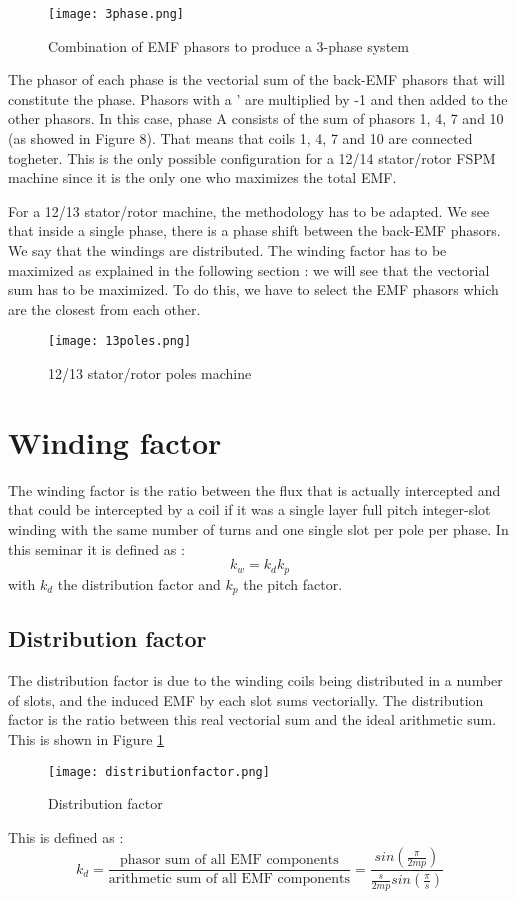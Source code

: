 \begin{figure}
    \centering
    \texttt{[image: 3phase.png]}
    \caption{Combination of EMF phasors to produce a 3-phase system}
\end{figure}

The phasor of each phase is the vectorial sum of the back-EMF phasors that will constitute the phase. Phasors with a ' are multiplied by -1 and then added to the other phasors. In this case, phase A consists of the sum of phasors 1, 4, 7 and 10 (as showed in Figure 8). That means that coils 1, 4, 7 and 10 are connected togheter. This is the only possible configuration for a 12/14 stator/rotor FSPM machine since it is the only one who maximizes the total EMF.

For a 12/13 stator/rotor machine, the methodology has to be adapted. We see that inside a single phase, there is a phase shift between the back-EMF phasors. We say that the windings are distributed. The winding factor has to be maximized as explained in the following section : we will see that the vectorial sum has to be maximized. To do this, we have to select the EMF phasors which are the closest from each other.

\begin{figure}
    \centering
    \texttt{[image: 13poles.png]}
    \caption{12/13 stator/rotor poles machine}
\end{figure}



\section{Winding factor}
The winding factor is the ratio between the flux that is actually intercepted and that could be intercepted by a coil if it was a single layer full pitch integer-slot winding with the same number of turns and one single slot per pole per phase. 
In this seminar it is defined as : 
\begin{equation}
    k_w = k_d k_p
\end{equation}
with $k_d$ the distribution factor and $k_p$ the pitch factor. 

\subsection{Distribution factor}
The distribution factor is due to the winding coils being distributed in a number of slots, and the induced EMF by each slot sums vectorially. The distribution factor is the ratio between this real vectorial sum and the ideal arithmetic sum. This is shown in Figure \ref{fig:distributionfactor}
\begin{figure}[H]
    \centering
    \texttt{[image: distributionfactor.png]}
    \caption{Distribution factor}
    \label{fig:distributionfactor}
\end{figure}
This is defined as : 
\begin{equation}
    k_d = \frac{\text{phasor sum of all EMF components}}{\text{arithmetic sum of all EMF components}} = \frac{sin \left ( \frac{\pi}{2mp}\right)}{\frac{s}{2mp} sin \left(\frac{\pi}{s}\right)}
\end{equation}

